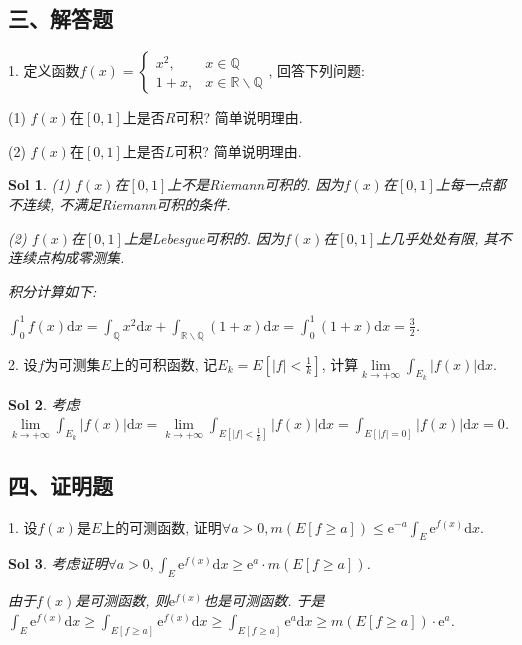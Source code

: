 \documentclass[UTF8]{article}
\newtheorem{solution}{Sol}
\begin{document}
  \subsection*{三、解答题}

  1. 定义函数$f(x)=\begin{cases}
    x^2, & x\in \mathbb{Q} \\
    1+x, & x\in \mathbb{R}\backslash \mathbb{Q}
  \end{cases}$, 回答下列问题:\par
  (1) $f(x)$在$[0,1]$上是否$R$可积? 简单说明理由.\par
  (2) $f(x)$在$[0,1]$上是否$L$可积? 简单说明理由.\par

  \begin{solution}
    (1) $f(x)$在$[0,1]$上不是Riemann可积的. 因为$f(x)$在$[0,1]$上每一点都不连续, 不满足Riemann可积的条件.\par
    (2) $f(x)$在$[0,1]$上是Lebesgue可积的. 因为$f(x)$在$[0,1]$上几乎处处有限, 其不连续点构成零测集.\par
    积分计算如下:\par
    $\int_{0}^{1}f(x)\mathrm{d}x=\int_{\mathbb{Q}}x^2\mathrm{d}x+\int_{\mathbb{R}\backslash \mathbb{Q}}(1+x)\mathrm{d}x=\int_{0}^{1}(1+x)\mathrm{d}x=\frac{3}{2}$.\par
  \end{solution}
    
  2. 设$f$为可测集$E$上的可积函数, 记$E_k=E\left[|f|<\frac{1}{k}\right]$, 计算$\lim \limits_{k \to +\infty}\int_{E_k}|f(x)|\mathrm{d}x$.\par

  \begin{solution}
    考虑$\lim \limits_{k \to +\infty}\int_{E_k}|f(x)|\mathrm{d}x=\lim \limits_{k \to +\infty}\int_{E\left[|f|<\frac{1}{k}\right]}|f(x)|\mathrm{d}x=\int_{E\left[|f|=0\right]}|f(x)|\mathrm{d}x=0$.\par
  \end{solution}

  \subsection*{四、证明题}

  1. 设$f(x)$是$E$上的可测函数, 证明$\forall a >0, m(E\left[f\geqslant a\right])\leqslant \mathrm{e}^{-a}\int_{E}\mathrm{e}^{f(x)}\mathrm{d}x$.\par

  \begin{solution}
    考虑证明$\forall a>0, \int_{E}\mathrm{e}^{f(x)}\mathrm{d}x\geqslant \mathrm{e}^a \cdot m(E\left[f\geqslant a\right])$.\par
    由于$f(x)$是可测函数, 则$\mathrm{e}^{f(x)}$也是可测函数. 于是$\int_{E}\mathrm{e}^{f(x)}\mathrm{d}x\geqslant \int_{E\left[f\geqslant a\right]}\mathrm{e}^{f(x)}\mathrm{d}x\geqslant \int_{E[f\geqslant a]}\mathrm{e}^{a}\mathrm{d}x\geqslant m(E[f\geqslant a])\cdot \mathrm{e}^a$.\par
  \end{solution}
\end{document}
